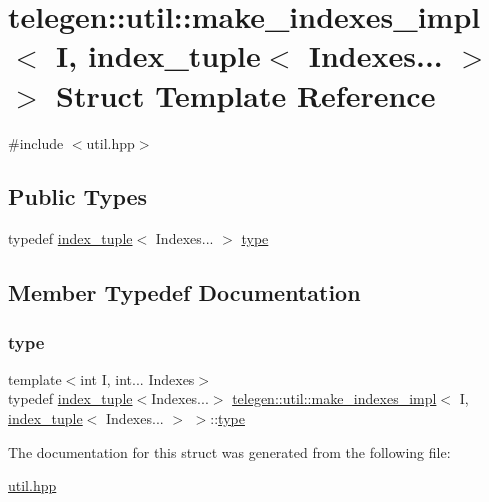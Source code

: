 \hypertarget{structtelegen_1_1util_1_1make__indexes__impl_3_01I_00_01index__tuple_3_01Indexes_8_8_8_01_4_01_4}{}\section{telegen\+:\+:util\+:\+:make\+\_\+indexes\+\_\+impl$<$ I, index\+\_\+tuple$<$ Indexes... $>$ $>$ Struct Template Reference}
\label{structtelegen_1_1util_1_1make__indexes__impl_3_01I_00_01index__tuple_3_01Indexes_8_8_8_01_4_01_4}


{\ttfamily \#include $<$util.\+hpp$>$}

\subsection*{Public Types}
\begin{DoxyCompactItemize}
\item 
typedef \hyperlink{structtelegen_1_1util_1_1index__tuple}{index\+\_\+tuple}$<$ Indexes... $>$ \hyperlink{structtelegen_1_1util_1_1make__indexes__impl_3_01I_00_01index__tuple_3_01Indexes_8_8_8_01_4_01_4_a9c2357b6a8e5f7418688518e21a5ac30}{type}
\end{DoxyCompactItemize}


\subsection{Member Typedef Documentation}
\mbox{\label{structtelegen_1_1util_1_1make__indexes__impl_3_01I_00_01index__tuple_3_01Indexes_8_8_8_01_4_01_4_a9c2357b6a8e5f7418688518e21a5ac30}} 
\subsubsection{\texorpdfstring{type}{type}}
{\footnotesize\ttfamily template$<$int I, int... Indexes$>$ \\
typedef \hyperlink{structtelegen_1_1util_1_1index__tuple}{index\+\_\+tuple}$<$Indexes...$>$ \hyperlink{structtelegen_1_1util_1_1make__indexes__impl}{telegen\+::util\+::make\+\_\+indexes\+\_\+impl}$<$ I, \hyperlink{structtelegen_1_1util_1_1index__tuple}{index\+\_\+tuple}$<$ Indexes... $>$ $>$\+::\hyperlink{structtelegen_1_1util_1_1make__indexes__impl_3_01I_00_01index__tuple_3_01Indexes_8_8_8_01_4_01_4_a9c2357b6a8e5f7418688518e21a5ac30}{type}}



The documentation for this struct was generated from the following file\+:\begin{DoxyCompactItemize}
\item 
\hyperlink{util_8hpp}{util.\+hpp}\end{DoxyCompactItemize}
